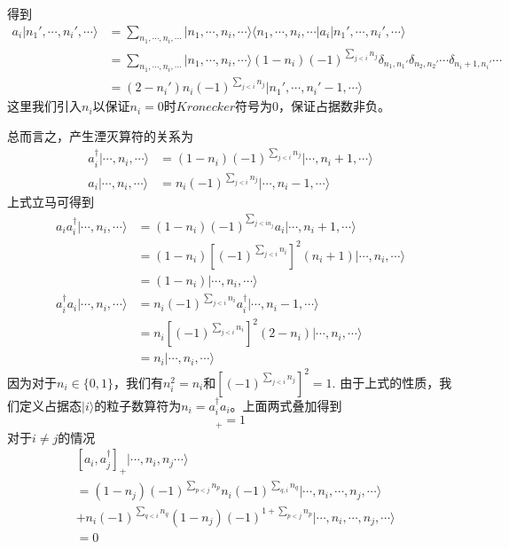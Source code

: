 \documentclass[12pt]{article}
\begin{document}
得到
\begin{equation*}
    \begin{split}
        a_i|n_1',\cdots,n_i',\cdots\rangle&=\sum_{n_1,\cdots,n_i,\cdots}|n_1,\cdots,n_i,\cdots\rangle\langle n_1,\cdots,n_i,\cdots|a_i|n_1',\cdots,n_i',\cdots\rangle\\
        &=\sum_{n_1,\cdots,n_i,\cdots}|n_1,\cdots,n_i,\cdots\rangle(1-n_i)(-1)^{\sum_{j<i}n_j}\delta_{n_1,n_1'}\delta_{n_2,n_2'}\cdots\delta_{n_i+1,n_i'}\cdots\\
        &=(2-n_i')n_i(-1)^{\sum_{j<i}n_j}|n_1',\cdots,n_i'-1,\cdots\rangle
    \end{split}
\end{equation*}
这里我们引入$n_i$以保证$n_i=0$时$Kronecker$符号为$0$，保证占据数非负。

总而言之，产生湮灭算符的关系为
\begin{equation*}
    \begin{split}
        a_i^\dagger|\cdots,n_i,\cdots\rangle&=(1-n_i)(-1)^{\sum_{j<i}n_j}|\cdots,n_i+1,\cdots\rangle\\
        a_i|\cdots,n_i,\cdots\rangle&=n_i(-1)^{\sum_{j<i}n_j}|\cdots,n_i-1,\cdots\rangle
    \end{split}
\end{equation*}
上式立马可得到
\begin{equation*}
    \begin{split}
        a_ia_i^\dagger|\cdots,n_i,\cdots\rangle&=(1-n_i)(-1)^{\sum_{j<in_j}}a_i|\cdots,n_i+1,\cdots\rangle\\
        &=(1-n_i)[(-1)^{\sum_{j<i}n_i}]^2(n_i+1)|\cdots,n_i,\cdots\rangle\\
        &=(1-n_i)|\cdots,n_i,\cdots\rangle\\
        a_i^\dagger a_i|\cdots,n_i,\cdots\rangle&=n_i(-1)^{\sum_{j<i}n_i}a_i^\dagger|\cdots,n_i-1,\cdots\rangle\\
        &=n_i[(-1)^{\sum_{j<i}n_i}]^2(2-n_i)|\cdots,n_i,\cdots\rangle\\
        &=n_i|\cdots,n_i,\cdots\rangle
    \end{split}
\end{equation*}
因为对于$n_i\in\{0,1\}$，我们有$n_i^2=n_i$和$[(-1)^{\sum_{j<i}n_j}]^2=1$. 由于上式的性质，我们定义占据态$|i\rangle$的粒子数算符为$n_i=a_i^\dagger a_i$。上面两式叠加得到
\begin{equation*}
    [a_i,a_i^\dagger]_+=1
\end{equation*}
对于$i\neq j$的情况
\begin{equation*}
    \begin{split}
        &[a_i,a_j^\dagger]_+|\cdots,n_i,n_j\cdots\rangle\\
        &=(1-n_j)(-1)^{\sum_{p<j}n_p}n_i(-1)^{\sum_{q,i}n_q}|\cdots,n_i,\cdots,n_j,\cdots\rangle\\
        &+n_i(-1)^{\sum_{q<i}n_q}(1-n_j)(-1)^{1+\sum_{p<j}n_p}|\cdots,n_i,\cdots,n_j,\cdots\rangle\\
        &=0
    \end{split}
\end{equation*}
\end{document}
